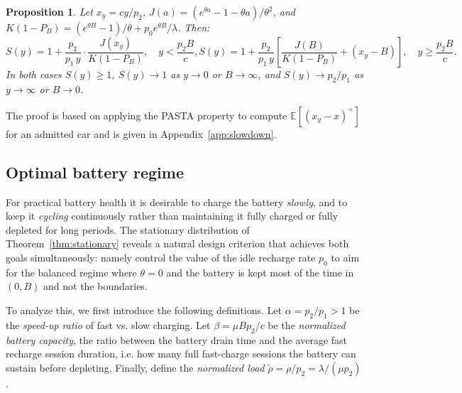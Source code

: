 \documentclass{sig-alternate-per-modified}
\newtheorem{proposition}[theorem]{Proposition}
\renewcommand{\geq}{\geqslant}
\begin{document}
\begin{proposition}\label{prop:slowdown}
Let $x_y = cy/p_2$, $J(a) = (e^{\theta a}-1-\theta a)/\theta^2$, and
$K(1-P_B) = (e^{\theta B}-1)/\theta + p_0 e^{\theta B}/\lambda$. Then:
\begin{subequations}\label{eq:Sy}
\begin{equation}
  S(y) = 1 + \frac{p_2}{p_1\,y}\cdot\frac{J(x_y)}{K(1-P_B)},
  \quad y < \frac{p_2 B}{c},
  \label{eq:Sy1}
\end{equation}
\begin{equation}
  S(y) = 1 + \frac{p_2}{p_1\,y}\left[\frac{J(B)}{K(1-P_B)} + (x_y - B)\right],
  \quad y \geq \frac{p_2 B}{c}.
  \label{eq:Sy2}
\end{equation}
\end{subequations}
In both cases $S(y)\geq 1$, $S(y)\to 1$ as $y\to 0$ or $B\to\infty$,
and $S(y)\to p_2/p_1$ as $y\to\infty$ or $B\to 0$.
\end{proposition}
The proof is based on applying the PASTA property to compute $\mathbb{E}[(x_y - x)^+]$ for an admitted car and is given in Appendix~\ref{app:slowdown}.


\subsection{Optimal battery regime}\label{ssec:optimal_regime}

For practical battery health it is desirable to charge the battery \emph{slowly}, and to keep it \emph{cycling}
continuously rather than maintaining it fully charged or fully depleted for long periods. The stationary distribution of Theorem~\ref{thm:stationary} reveals a natural design criterion that achieves both goals simultaneously: namely control the value of the idle recharge rate $p_0$ to aim for the balanced regime where $\theta=0$ and the battery is kept most of the time in $(0,B)$ and not the boundaries.

To analyze this, we first introduce the following definitions. Let $\alpha = p_2/p_1 >1$ be the \emph{speed-up ratio} of fast vs. slow charging. Let $\beta = \mu B p_2 / c$ be the \emph{normalized battery capacity}, the ratio between the battery drain time and the average fast recharge session duration, i.e. how many full fast-charge sessions the battery can sustain before depleting. Finally, define the \emph{normalized load}
$\tilde\rho = \rho/p_2 = \lambda/(\mu p_2)$.
\end{document}
